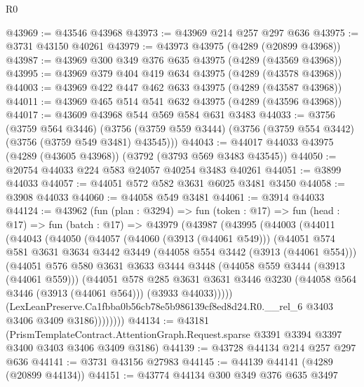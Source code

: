 \begin{lexlean}{R0}
\begin{coremodule}
@43969 := @43546 @43968
@43973 := @43969 @214 @257 @297 @636
@43975 := @3731 @43150 @40261
@43979 := @43973 @43975 (@4289 (@20899 @43968))
@43987 := @43969 @300 @349 @376 @635 @43975 (@4289 (@43569 @43968))
@43995 := @43969 @379 @404 @419 @634 @43975 (@4289 (@43578 @43968))
@44003 := @43969 @422 @447 @462 @633 @43975 (@4289 (@43587 @43968))
@44011 := @43969 @465 @514 @541 @632 @43975 (@4289 (@43596 @43968))
@44017 := @43609 @43968 @544 @569 @584 @631 @3483
@44033 := @3756
    (@3759 @564 @3446)
    (@3756 (@3759 @559 @3444) (@3756 (@3759 @554 @3442) (@3756 (@3759 @549 @3481) @43545)))
@44043 := @44017 @44033 @43975 (@4289 (@43605 @43968)) (@3792 (@3793 @569 @3483 @43545))
@44050 := @20754 @44033 @224 @583 @24057 @40254 @3483 @40261
@44051 := @3899 @44033
@44057 := @44051 @572 @582 @3631 @6025 @3481 @3450
@44058 := @3908 @44033
@44060 := @44058 @549 @3481
@44061 := @3914 @44033
@44124 := @43962
    (fun (plan : @3294) =>
    fun (token : @17) =>
    fun (head : @17) =>
    fun (batch : @17) =>
    @43979
      (@43987
        (@43995
          (@44003
            (@44011
              (@44043
                (@44050
                  (@44057
                    (@44060 (@3913 (@44061 @549)))
                    (@44051
                      @574
                      @581
                      @3631
                      @3634
                      @3442
                      @3449
                      (@44058 @554 @3442 (@3913 (@44061 @554)))
                      (@44051
                        @576
                        @580
                        @3631
                        @3633
                        @3444
                        @3448
                        (@44058 @559 @3444 (@3913 (@44061 @559)))
                        (@44051
                          @578
                          @285
                          @3631
                          @3631
                          @3446
                          @3230
                          (@44058 @564 @3446 (@3913 (@44061 @564)))
                          (@3933 @44033)))))
                  (LexLeanPreserve.Ca1fbba0b56cb78e5b986139cf8ed8d24.R0.__rel_6
                    @3403
                    @3406
                    @3409
                    @3186))))))))
@44134 := @43181
    (PrismTemplateContract.AttentionGraph.Request.sparse
      @3391
      @3394
      @3397
      @3400
      @3403
      @3406
      @3409
      @3186)
@44139 := @43728 @44134 @214 @257 @297 @636
@44141 := @3731 @43156 @27983
@44145 := @44139 @44141 (@4289 (@20899 @44134))
@44151 := @43774 @44134 @300 @349 @376 @635 @3497

\end{coremodule}
\end{lexlean}
